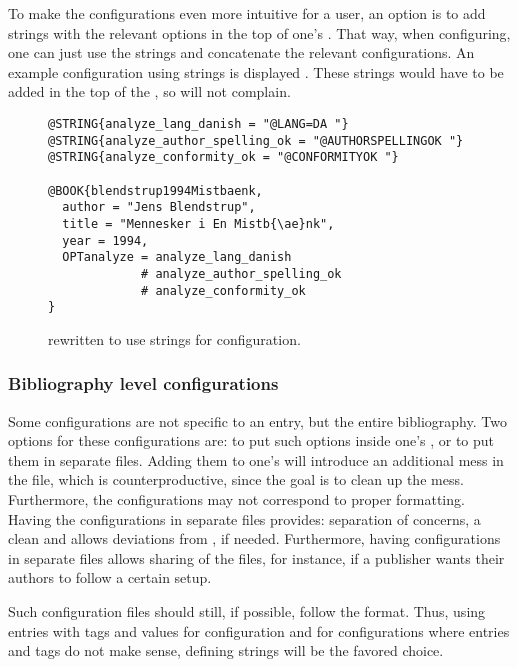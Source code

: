 To make the configurations even more intuitive for a {\bibtex} user,
an option is to add {\bibtex} strings with the relevant options in the
top of one's .  That way, when configuring, one can just use
the {\bibtex} strings and concatenate the relevant configurations.  An
example configuration using strings is displayed
.  These
strings would have to be added in the top of the , so
{\bibtex} will not complain.

\begin{figure}
  \centering
\begin{verbatim}
@STRING{analyze_lang_danish = "@LANG=DA "}
@STRING{analyze_author_spelling_ok = "@AUTHORSPELLINGOK "}
@STRING{analyze_conformity_ok = "@CONFORMITYOK "}

@BOOK{blendstrup1994Mistbaenk,
  author = "Jens Blendstrup",
  title = "Mennesker i En Mistb{\ae}nk",
  year = 1994,
  OPTanalyze = analyze_lang_danish
             # analyze_author_spelling_ok
             # analyze_conformity_ok
}
\end{verbatim}
  \caption{
    rewritten to use strings for configuration.}
  \label{fig:analyzing_added_de_facto_standards_strings}
\end{figure}


\subsubsection{Bibliography level configurations}

Some configurations are not specific to an entry, but the entire
bibliography.  Two options for these configurations are: to put such
options inside one's , or to put them in separate files.
Adding them to one's  will introduce an additional mess in
the file, which is counterproductive, since the goal is to clean up
the mess.  Furthermore, the configurations may not correspond to
proper {\bibtex} formatting.  Having the configurations in separate
files provides: separation of concerns, a clean  and allows
deviations from {\bibtex}, if needed.  Furthermore, having
configurations in separate files allows sharing of the files, for
instance, if a publisher wants their authors to follow a certain
setup.

Such configuration files should still, if possible, follow the
{\bibtex} format.  Thus, using entries with tags and values for
configuration and for configurations where entries and tags do not
make sense, defining {\bibtex} strings will be the favored choice.

